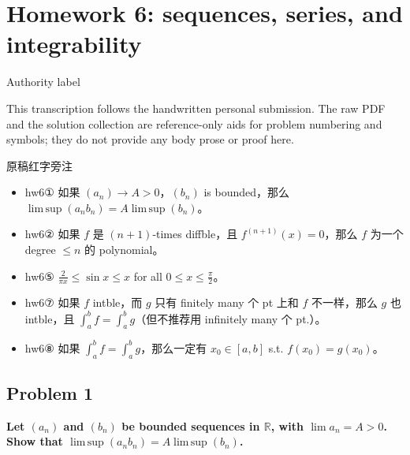 \chapter{Homework 6: sequences, series, and integrability}

\begin{qlremark}{Authority label}

This transcription follows the handwritten personal submission. The raw PDF and the solution collection are reference-only aids for problem numbering and symbols; they do not provide any body prose or proof here.

\end{qlremark}

\begin{qlremark}{原稿红字旁注}

\begin{itemize}
\tightlist
\item
  hw6① 如果 \(\left( a_{n} \right)\rightarrow A > 0\)，\(\left( b_{n} \right)\) is bounded，那么 \(\operatorname{lim\, sup}\left( {a_{n}b_{n}} \right) = A\operatorname{lim\, sup}\left( b_{n} \right)\)。
\item
  hw6② 如果 \(f\) 是 \(\left( {n + 1} \right)\)-times diffble，且 \(f^{({n + 1})}(x) = 0\)，那么 \(f\) 为一个 degree \(\leq n\) 的 polynomial。
\item
  hw6⑤ \(\frac{2}{\pi x} \leq \sin x \leq x\) for all \(0 \leq x \leq \frac{\pi}{2}\)。
\item
  hw6⑦ 如果 \(f\) intble，而 \(g\) 只有 finitely many 个 pt 上和 \(f\) 不一样，那么 \(g\) 也 intble，且 \(\int_{a}^{b}f = \int_{a}^{b}g\)（但不推荐用 infinitely many 个 pt.）。
\item
  hw6⑧ 如果 \(\int_{a}^{b}f = \int_{a}^{b}g\)，那么一定有 \(x_{0} \in \left\lbrack {a,b} \right\rbrack\) s.t. \(f\left( x_{0} \right) = g\left( x_{0} \right)\)。
\end{itemize}

\end{qlremark}

\section{Problem 1}

\textbf{Let \(\left( a_{n} \right)\) and \(\left( b_{n} \right)\) be bounded sequences in \(\mathbb{R}\), with \(\lim a_{n} = A > 0\). Show that \(\operatorname{lim\, sup}\left( {a_{n}b_{n}} \right) = A\operatorname{lim\, sup}\left( b_{n} \right)\).}

